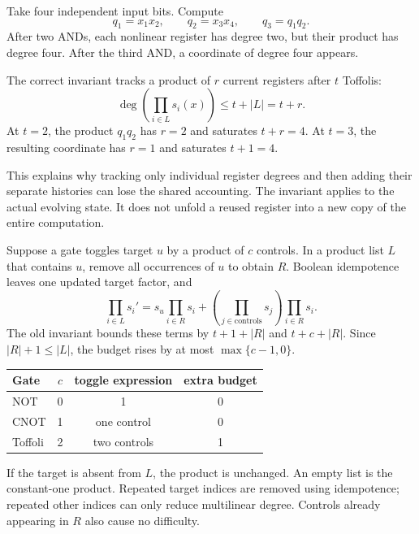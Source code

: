 Take four independent input bits. Compute
\[
 q_1=x_1x_2,\qquad q_2=x_3x_4,\qquad q_3=q_1q_2.
\]
After two ANDs, each nonlinear register has degree two, but their product
has degree four. After the third AND, a coordinate of degree four appears.


The correct invariant tracks a product of $r$ current registers after $t$
Toffolis:
\[
 \deg\!\left(\prod_{i\in L}s_i(x)\right)\le t+|L|=t+r.
\]
At $t=2$, the product $q_1q_2$ has $r=2$ and saturates $t+r=4$. At $t=3$,
the resulting coordinate has $r=1$ and saturates $t+1=4$.

This explains why tracking only individual register degrees and then
adding their separate histories can lose the shared accounting. The
invariant applies to the actual evolving state. It does not unfold a
reused register into a new copy of the entire computation.


Suppose a gate toggles target $u$ by a product of $c$ controls. In a product
list $L$ that contains $u$, remove all occurrences of $u$ to obtain $R$.
Boolean idempotence leaves one updated target factor, and
\[
 \prod_{i\in L}s_i'=
 s_u\prod_{i\in R}s_i+
 \left(\prod_{j\in\mathrm{controls}}s_j\right)\prod_{i\in R}s_i.
\]
The old invariant bounds these terms by $t+1+|R|$ and $t+c+|R|$.
Since $|R|+1\le |L|$, the budget rises by at most $\max\{c-1,0\}$.

\begin{center}
\begin{tabular}{@{}lccc@{}}\toprule
Gate & $c$ & toggle expression & extra budget\\\midrule
NOT & 0 & 1 & 0\\
CNOT & 1 & one control & 0\\
Toffoli & 2 & two controls & 1\\\bottomrule
\end{tabular}
\end{center}

If the target is absent from $L$, the product is unchanged. An empty list
is the constant-one product. Repeated target indices are removed using
idempotence; repeated other indices can only reduce multilinear degree.
Controls already appearing in $R$ also cause no difficulty.

